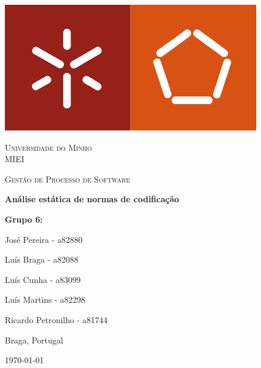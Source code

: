 \begin{titlepage}
	\centering
	\includegraphics[width=0.4\linewidth]{images/logo-ee.png}\\[4ex]
	{\scshape\LARGE Universidade do Minho \\ MIEI\par}
	\vspace{1cm}
    	{\scshape\Large Gestão de Processo de Software\par}
	\vspace{1.5cm}
	{\LARGE\bfseries
		Análise estática de normas de codificação\par }
	\vspace{1cm}
	
	\vfill 
	
    \textbf{Grupo 6:}\par
    José Pereira   -   a82880  \par
    Luís Braga     -   a82088  \par
	Luís Cunha     -   a83099\par
    Luís Martins   -   a82298\par
    Ricardo Petronilho - a81744   \par
	
	\vfill
	
	{\large Braga, Portugal\par \today\par}
\end{titlepage}